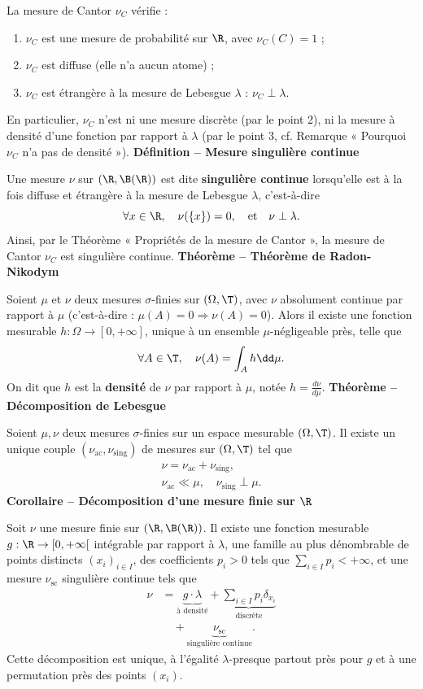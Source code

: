 La mesure de Cantor $\nu_C$ vérifie :
\begin{enumerate}
\item $\nu_C$ est une mesure de probabilité sur $\R$, avec $\nu_C(C)=1$ ;
\item $\nu_C$ est diffuse (elle n’a aucun atome) ;
\item $\nu_C$ est étrangère à la mesure de Lebesgue $\lambda$ : $\nu_C\perp\lambda$.
\end{enumerate}
En particulier, $\nu_C$ n’est ni une mesure discrète (par le point 2), ni la mesure à densité d’une fonction par rapport à $\lambda$ (par le point 3, cf. Remarque « Pourquoi $\nu_C$ n’a pas de densité »).
\textbf{Définition – Mesure singulière continue}

Une mesure $\nu$ sur $(\R,\B(\R))$ est dite \textbf{singulière continue} lorsqu’elle est à la fois diffuse et étrangère à la mesure de Lebesgue $\lambda$, c’est-à-dire
\[\forall x\in\R,\quad\nu(\{x\})=0,\quad\text{et}\quad\nu\perp\lambda.\]
Ainsi, par le Théorème « Propriétés de la mesure de Cantor », la mesure de Cantor $\nu_C$ est singulière continue.
\textbf{Théorème – Théorème de Radon-Nikodym}

Soient $\mu$ et $\nu$ deux mesures $\sigma$-finies sur $(\Omega,\T)$, avec $\nu$ absolument continue par rapport à $\mu$ (c’est-à-dire : $\mu(A)=0\Rightarrow\nu(A)=0$). Alors il existe une fonction mesurable $h:\Omega\to[0,+\infty]$, unique à un ensemble $\mu$-négligeable près, telle que
\[\forall A\in\T,\quad\nu(A)=\int_A h\dd\mu.\]
On dit que $h$ est la \textbf{densité} de $\nu$ par rapport à $\mu$, notée $h=\frac{d\nu}{d\mu}$.
\textbf{Théorème – Décomposition de Lebesgue}

Soient $\mu,\nu$ deux mesures $\sigma$-finies sur un espace mesurable $(\Omega,\T)$. Il existe un unique couple $(\nu_{\mathrm{ac}},\nu_{\mathrm{sing}})$ de mesures sur $(\Omega,\T)$ tel que
\[
\begin{gathered}
\nu=\nu_{\mathrm{ac}}+\nu_{\mathrm{sing}},\\
\nu_{\mathrm{ac}}\ll\mu,\quad\nu_{\mathrm{sing}}\perp\mu.
\end{gathered}
\]
\textbf{Corollaire – Décomposition d’une mesure finie sur $\R$}

Soit $\nu$ une mesure finie sur $(\R,\B(\R))$. Il existe une fonction mesurable $g:\R\to[0,+\infty[$ intégrable par rapport à $\lambda$, une famille au plus dénombrable de points distincts $(x_i)_{i\in I}$, des coefficients $p_i>0$ tels que $\sum_{i\in I}p_i<+\infty$, et une mesure $\nu_{\mathrm{sc}}$ singulière continue tels que
\[
\begin{aligned}
\nu&=\underbrace{g\cdot\lambda}_{\text{à densité}}+\underbrace{\sum_{i\in I}p_i\delta_{x_i}}_{\text{discrète}}\\
&\quad+\underbrace{\nu_{\mathrm{sc}}}_{\text{singulière continue}}.
\end{aligned}
\]
Cette décomposition est unique, à l’égalité $\lambda$-presque partout près pour $g$ et à une permutation près des points $(x_i)$.
